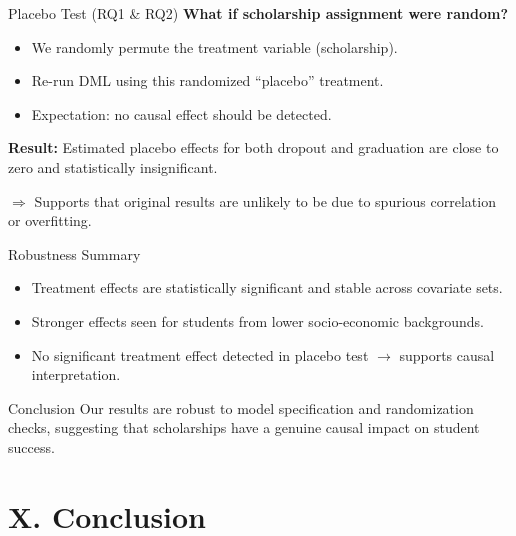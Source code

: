 \documentclass[aspectratio=169]{beamer}
\begin{document}
\begin{frame}{Placebo Test (RQ1 \& RQ2)}
\textbf{What if scholarship assignment were random?}
\vspace{10pt}

\begin{itemize}
    \item We randomly permute the treatment variable (scholarship).
    \item Re-run DML using this randomized “placebo” treatment.
    \item Expectation: no causal effect should be detected.
\end{itemize}

\vspace{10pt}
\textbf{Result:} Estimated placebo effects for both dropout and graduation are close to zero and statistically insignificant.

\vspace{5pt}
$\Rightarrow$ Supports that original results are unlikely to be due to spurious correlation or overfitting.
\end{frame}


\begin{frame}{Robustness Summary}
\begin{itemize}
    \item Treatment effects are statistically significant and stable across covariate sets.
    \item Stronger effects seen for students from lower socio-economic backgrounds.
    \item No significant treatment effect detected in placebo test $\rightarrow$ supports causal interpretation.
\end{itemize}

\vspace{10pt}
\begin{block}{Conclusion}
Our results are robust to model specification and randomization checks, suggesting that scholarships have a genuine causal impact on student success.
\end{block}

\end{frame}

\section{X. Conclusion}

  
\end{document}
